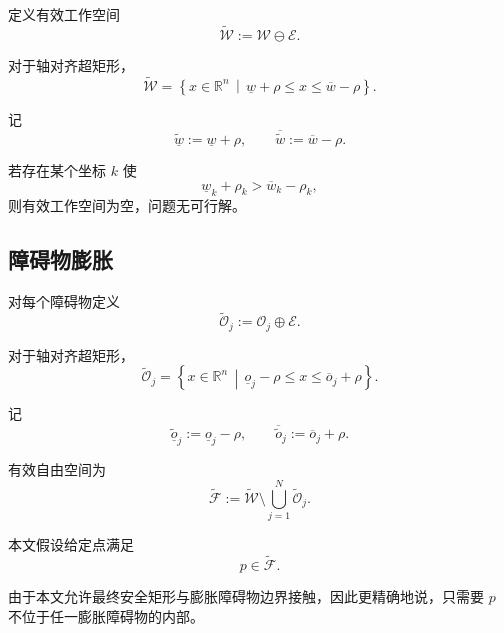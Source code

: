\documentclass[UTF8,12pt,a4paper]{ctexart}
\newcommand{\R}{\mathbb{R}}
\begin{document}
定义有效工作空间
\begin{equation}
    \widetilde{\mathcal W}
    :=
    \mathcal W\ominus\mathcal E.
\end{equation}

对于轴对齐超矩形，
\begin{equation}
    \widetilde{\mathcal W}
    =
    \left\{
    x\in\R^n
    \,\middle|\,
    \underline w+\rho
    \le x\le
    \overline w-\rho
    \right\}.
\end{equation}

记
\begin{equation}
    \underline{\widetilde w}
    :=
    \underline w+\rho,
    \qquad
    \overline{\widetilde w}
    :=
    \overline w-\rho.
\end{equation}

若存在某个坐标 $k$ 使
\[
\underline w_k+\rho_k
>
\overline w_k-\rho_k,
\]
则有效工作空间为空，问题无可行解。

\subsection{障碍物膨胀}

对每个障碍物定义
\begin{equation}
    \widetilde{\mathcal O}_j
    :=
    \mathcal O_j\oplus\mathcal E.
\end{equation}

对于轴对齐超矩形，
\begin{equation}
    \widetilde{\mathcal O}_j
    =
    \left\{
    x\in\R^n
    \,\middle|\,
    \underline o_j-\rho
    \le x\le
    \overline o_j+\rho
    \right\}.
\end{equation}

记
\begin{equation}
    \underline{\widetilde o}_j
    :=
    \underline o_j-\rho,
    \qquad
    \overline{\widetilde o}_j
    :=
    \overline o_j+\rho.
\end{equation}

有效自由空间为
\begin{equation}
    \widetilde{\mathcal F}
    :=
    \widetilde{\mathcal W}
    \setminus
    \bigcup_{j=1}^{N}
    \widetilde{\mathcal O}_j.
\end{equation}

本文假设给定点满足
\begin{equation}
    p\in\widetilde{\mathcal F}.
\end{equation}

由于本文允许最终安全矩形与膨胀障碍物边界接触，因此更精确地说，只需要 $p$ 不位于任一膨胀障碍物的内部。
\end{document}
